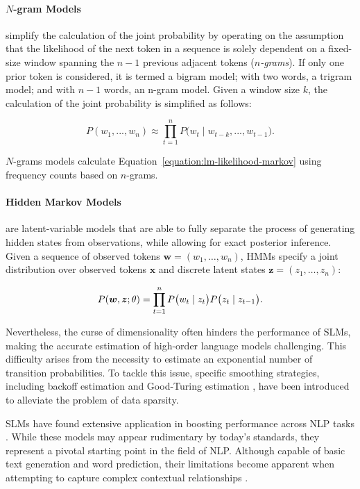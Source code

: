 \paragraph{$N$-gram Models} simplify the calculation of the joint probability by operating on the assumption that the likelihood of the next token in a sequence is solely dependent on a fixed-size window spanning the $n-1$ previous adjacent tokens (\textit{$n$-grams}). If only one prior token is considered, it is termed a bigram model; with two words, a trigram model; and with $n-1$ words, an n-gram model. Given a window size $k$, the calculation of the joint probability is simplified as follows:

\begin{equation}
    P(w_1, ..., w_n) \approx \prod_{t=1}^{n} P\bigl(w_t \mid w_{t-k}, ..., w_{t-1}\bigr).
    \label{equation:lm-likelihood-markov}
\end{equation}

$N$-grams models calculate Equation~\ref{equation:lm-likelihood-markov} using frequency counts based on $n$-grams. 

\paragraph{Hidden Markov Models} are latent-variable models that are able to fully separate the process of generating hidden states from observations, while allowing for exact posterior inference. Given a sequence of observed tokens $\bm{w} = (w_1, \ldots, w_n)$, \acp{HMM} specify a joint distribution over observed tokens $\bm{x}$ and discrete latent states $\bm{z} = (z_1, \ldots, z_n)$:

\begin{equation}
    P(\bm{w}, \bm{z}; \theta) = \prod_{t=1}^{n} P\bigl(w_t \mid z_t \bigr) P\bigl(z_t \mid z_{t-1} \bigr). \\
\end{equation}


Nevertheless, the curse of dimensionality often hinders the performance of \acp{SLM}, making the accurate estimation of high-order language models challenging. This difficulty arises from the necessity to estimate an exponential number of transition probabilities. To tackle this issue, specific smoothing strategies, including backoff estimation \citep{katz1987estimation} and Good-Turing estimation \citep{gale1995good}, have been introduced to alleviate the problem of data sparsity.

\acp{SLM} have found extensive application in boosting performance across \ac{NLP} tasks \citep{bahl1989tree, thede1999second}. While these models may appear rudimentary by today's standards, they represent a pivotal starting point in the field of \ac{NLP}. Although capable of basic text generation and word prediction, their limitations become apparent when attempting to capture complex contextual relationships \citep{rosenfeld2000two, arisoy2012deep}.


